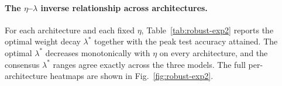 
\paragraph{The $\eta$--$\lambda$ inverse relationship across architectures.}
For each architecture and each fixed $\eta$, Table~\ref{tab:robust-exp2} reports the optimal weight decay $\lambda^{*}$ together with the peak test accuracy attained. The optimal $\lambda^{*}$ decreases monotonically with $\eta$ on every architecture, and the consensus $\lambda^{*}$ ranges agree exactly across the three models.
The full per-architecture heatmaps are shown in Fig.~\ref{fig:robust-exp2}.

